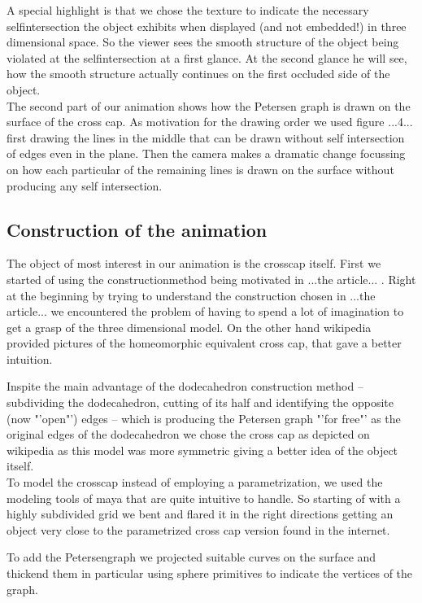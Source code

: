 \documentclass[12pt,            %
               a4paper,         %
               oneside,         %
               DIV12,           %
               fleqn,           %
               halfparskip,     %
               nochapterprefix, %
               bibtotocnumbered,%
              ]{scrartcl} %
\theoremstyle{definition}
\begin{document}
A special highlight is that we chose the texture to indicate the necessary selfintersection the object exhibits when displayed (and not embedded!) in three dimensional space. So the viewer sees the smooth structure of the object being violated at the selfintersection at a first glance. At the second glance he will see, how the smooth structure actually continues on the first occluded side of the object. \\

The second part of our animation shows how the Petersen graph is drawn on the surface of the cross cap. As motivation for the drawing order we used figure ...4... first drawing the lines in the middle that can be drawn without self intersection of edges even in the plane.
Then the camera makes a dramatic change focussing on how each particular of the remaining lines is drawn on the surface without producing any self intersection.

\subsection{Construction of the animation}

The object of most interest in our animation is the crosscap itself. First we started of using the constructionmethod being motivated in ...the article... . Right at the beginning by trying to understand the construction chosen in ...the article... we encountered the problem of having to spend a lot of imagination to get a grasp of the three dimensional model. On the other hand wikipedia provided pictures of the homeomorphic equivalent cross cap, that gave a better intuition.

Inspite the main advantage of the dodecahedron construction method -- subdividing the dodecahedron, cutting of its half and identifying the opposite (now "'open"') edges -- which is producing the Petersen graph "'for free"' as the original edges of the dodecahedron we chose the cross cap as depicted on wikipedia as this model was more symmetric giving a better idea of the object itself. \\

To model the crosscap instead of employing a parametrization, we used the modeling tools of maya that are quite intuitive to handle. So starting of with a highly subdivided grid we bent and flared it in the right directions getting an object very close to the parametrized cross cap version found in the internet.

To add the Petersengraph we projected suitable curves on the surface and thickend them in particular using sphere primitives to indicate the vertices of the graph. \\
\end{document}
